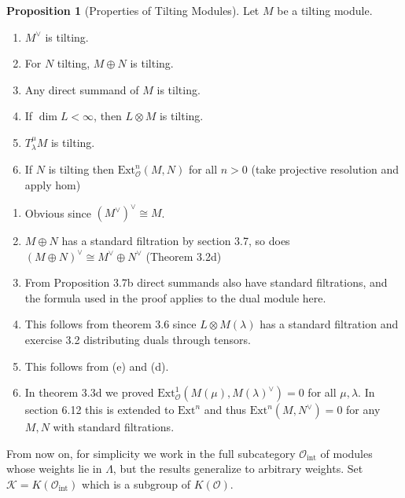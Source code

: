 \documentclass[11pt]{scrartcl}
\theoremstyle{definition}
\theoremstyle{theorem}
\newtheorem{proposition}[theorem]{Proposition}
\theoremstyle{proof}
\newenvironment{proof}
{\pushQED{$\qed$}\pf}
{\par\popQED\endpf}
\theoremstyle{definition}
\theoremstyle{break}
\theoremstyle{problem}
\providecommand{\tightlist}{%
  \setlength{\itemsep}{0pt}\setlength{\parskip}{0pt}}
\newcommand{\ext}[0]{\text{Ext}}
\newcommand{\dual}[0]{^\vee}
\newcommand{\OO}[0]{{\mathcal{O}}}
\newcommand{\mck}[0]{{\mathcal{K}}}
\newcommand{\tensor}[0]{\otimes}
\renewcommand{\qed}[0]{\hfill\blacksquare}
\begin{document}
\begin{proposition}[Properties of Tilting Modules]

Let \(M\) be a tilting module.

\begin{enumerate}
\def\labelenumi{\alph{enumi}.}
\tightlist
\item
  \(M\dual\) is tilting.
\item
  For \(N\) tilting, \(M \oplus N\) is tilting.
\item
  Any direct summand of \(M\) is tilting.
\item
  If \(\dim L < \infty\), then \(L \tensor M\) is tilting.
\item
  \(T_\lambda^\mu M\) is tilting.
\item
  If \(N\) is tilting then \(\ext_\OO^n(M, N)\) for all \(n>0\) (take
  projective resolution and apply hom)
\end{enumerate}

\end{proposition}

\begin{proof}

\hfill

\begin{enumerate}
\def\labelenumi{\alph{enumi}.}
\tightlist
\item
  Obvious since \((M\dual)\dual \cong M\).
\item
  \(M\oplus N\) has a standard filtration by section 3.7, so does
  \((M\oplus N)\dual \cong M\dual \oplus N\dual\) (Theorem 3.2d)
\item
  From Proposition 3.7b direct summands also have standard filtrations,
  and the formula used in the proof applies to the dual module here.
\item
  This follows from theorem 3.6 since \(L \tensor M(\lambda)\) has a
  standard filtration and exercise 3.2 distributing duals through
  tensors.
\item
  This follows from (e) and (d).
\item
  In theorem 3.3d we proved \(\ext_\OO^1 (M(\mu), M(\lambda)\dual) = 0\)
  for all \(\mu, \lambda\). In section 6.12 this is extended to
  \(\ext^n\) and thus \(\ext^n(M, N\dual) = 0\) for any \(M, N\) with
  standard filtrations.
\end{enumerate}

\end{proof}

From now on, for simplicity we work in the full subcategory
\(\OO_{\text{int}}\) of modules whose weights lie in \(\Lambda\), but
the results generalize to arbitrary weights. Set
\(\mck = K(\OO_{\text{int}})\) which is a subgroup of \(K(\OO)\).
\end{document}
